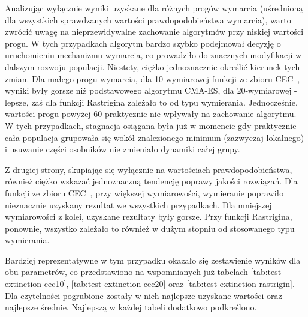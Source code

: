 \documentclass[10pt]{article}
\begin{document}
Analizując wyłącznie wyniki uzyskane dla różnych progów wymarcia (uśrednioną dla wszystkich sprawdzanych wartości prawdopodobieństwa wymarcia), warto zwrócić uwagę na nieprzewidywalne zachowanie algorytmów przy niskiej wartości progu. W tych przypadkach algorytm bardzo szybko podejmował decyzję o uruchomieniu mechanizmu wymarcia, co prowadziło do znacznych modyfikacji w dalszym rozwoju populacji. Niestety, ciężko jednoznacznie określić kierunek tych zmian. Dla małego progu wymarcia, dla 10-wymiarowej funkcji ze zbioru CEC~\cite{CEC}, wyniki były gorsze niż podstawowego algorytmu CMA-ES, dla 20-wymiarowej - lepsze, zaś dla funkcji Rastrigina zależało to od typu wymierania. Jednocześnie, wartości progu powyżej 60 praktycznie nie wpływały na zachowanie algorytmu. W tych przypadkach, stagnacja osiągana była już w momencie gdy praktycznie cała populacja grupowała się wokół znalezionego minimum (zazwyczaj lokalnego) i usuwanie części osobników nie zmieniało dynamiki całej grupy.

Z drugiej strony, skupiając się wyłącznie na wartościach prawdopodobieństwa, również ciężko wskazać jednoznaczną tendencję poprawy jakości rozwiązań. Dla funkcji ze zbioru CEC~\cite{CEC}, przy większej wymiarowości, wymieranie poprawiło nieznacznie uzyskany rezultat we wszystkich przypadkach. Dla mniejszej wymiarowości z kolei, uzyskane rezultaty były gorsze. Przy funkcji Rastrigina, ponownie, wszystko zależało to również w dużym stopniu od stosowanego typu wymierania.

Bardziej reprezentatywne w tym przypadku okazało się zestawienie wyników dla obu parametrów, co przedstawiono na wspomnianych już tabelach \ref{tab:test-extinction-cec10}, \ref{tab:test-extinction-cec20} oraz \ref{tab:test-extinction-rastrigin}. Dla czytelności pogrubione zostały w nich najlepsze uzyskane wartości oraz najlepsze średnie. Najlepszą w każdej tabeli dodatkowo podkreślono.
\end{document}
